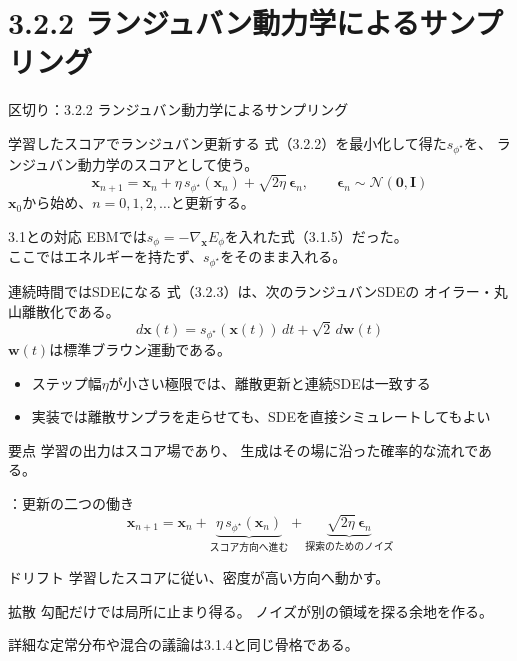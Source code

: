 \section{3.2.2 ランジュバン動力学によるサンプリング}
\asmain
\begin{frame}{区切り：3.2.2 ランジュバン動力学によるサンプリング}
    \tableofcontents[currentsection]
\end{frame}
\asmain
\begin{frame}{学習したスコアでランジュバン更新する}
    式（3.2.2）を最小化して得た$s_{\phi^\star}$を、
    ランジュバン動力学のスコアとして使う。
    \[
        \bm{x}_{n+1}
        =
        \bm{x}_n
        +
        \eta\,s_{\phi^\star}(\bm{x}_n)
        +
        \sqrt{2\eta}\,\bm{\epsilon}_n,
        \qquad
        \bm{\epsilon}_n\sim\mathcal{N}(\bm{0},\bm{I})
        \tag{3.2.3}
    \]
    $\bm{x}_0$から始め、$n=0,1,2,\ldots$と更新する。
    \begin{block}{3.1との対応}
        EBMでは$s_\phi=-\nabla_{\bm{x}}E_\phi$を入れた式（3.1.5）だった。\\
        ここではエネルギーを持たず、$s_{\phi^\star}$をそのまま入れる。
    \end{block}
\end{frame}
\asmain
\begin{frame}{連続時間ではSDEになる}
    式（3.2.3）は、次のランジュバンSDEの
    オイラー・丸山離散化である。
    \[
        d\bm{x}(t)
        =
        s_{\phi^\star}(\bm{x}(t))\,dt
        +
        \sqrt{2}\,d\bm{w}(t)
    \]
    $\bm{w}(t)$は標準ブラウン運動である。
    \begin{itemize}
        \item ステップ幅$\eta$が小さい極限では、離散更新と連続SDEは一致する
        \item 実装では離散サンプラを走らせても、SDEを直接シミュレートしてもよい
    \end{itemize}
    \begin{block}{要点}
        学習の出力はスコア場であり、
        生成はその場に沿った確率的な流れである。
    \end{block}
\end{frame}
\assuppl
\begin{frame}{\supplmark：更新の二つの働き}
    \[
        \bm{x}_{n+1}
        =
        \bm{x}_n
        +
        \underbrace{\eta\,s_{\phi^\star}(\bm{x}_n)}_{\text{スコア方向へ進む}}
        +
        \underbrace{\sqrt{2\eta}\,\bm{\epsilon}_n}_{\text{探索のためのノイズ}}
    \]
    \begin{exampleblock}{ドリフト}
        学習したスコアに従い、密度が高い方向へ動かす。
    \end{exampleblock}
    \begin{exampleblock}{拡散}
        勾配だけでは局所に止まり得る。
        ノイズが別の領域を探る余地を作る。
    \end{exampleblock}
    詳細な定常分布や混合の議論は3.1.4と同じ骨格である。
\end{frame}
